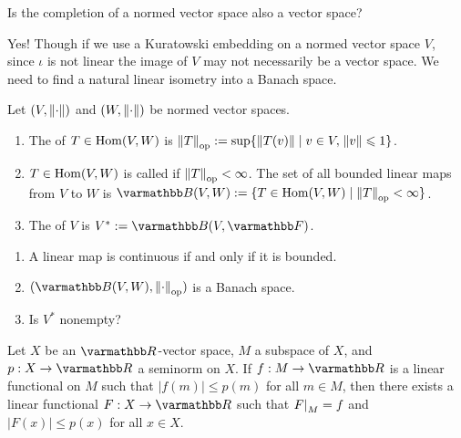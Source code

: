 \documentclass[10pt,oneside,openany]{memoir}
\begin{document}
\begin{question}
Is the completion of a normed vector space also a vector space?
\end{question}
\begin{answer}
Yes! Though if we use a Kuratowski embedding on a normed vector space $V$, since $\iota$ is not linear the image of $V$ may not necessarily be a vector space. We need to find a natural linear isometry into a Banach space.
\end{answer}

\begin{definition}
    Let $(V,\lnorm \cdot \rnorm)$ and $(W,\lnorm \cdot\rnorm)$ be normed vector spaces.
    \begin{enumerate}[label = (\arabic*),itemsep=1pt,topsep=3pt]
        \item The  of $T \in \Hom(V,W)$ is $\lnorm T \rnorm_{\op} := \sup\{\lnorm T(v) \rnorm \mid v \in V, \h1\lnorm v \rnorm \leq 1\}$.
        \item $T \in \Hom(V,W)$ is called  if $\lnorm T \rnorm_{\op} < \infty$. The set of all bounded linear maps from $V$ to $W$ is $\bfB(V,W) := \{T \in \Hom(V,W) \mid \lnorm T \rnorm_{\op} < \infty\}$.
        \item The  of $V$ is $V^\ast:= \bfB(V,\bfF)$.
    \end{enumerate}
\end{definition}

\begin{remarks}
\phantom{a}
\begin{enumerate}[label = (\arabic*),itemsep=1pt,topsep=3pt]
    \item A linear map is continuous if and only if it is bounded. 
    \item $(\bfB(V,W), \lnorm \cdot\rnorm_{\op})$ is a Banach space.
    \item Is $V^\ast$ nonempty?
\end{enumerate}
\end{remarks}

\begin{theorem}
    Let $X$ be an $\bfR$-vector space, $M$ a subspace of $X$, and $p:X \rightarrow \bfR$ a seminorm on $X$. If $f:M \rightarrow \bfR$ is a linear functional on $M$ such that $|f(m)| \leq p(m)$ for all $m \in M$, then there exists a linear functional $F:X \rightarrow \bfR$ such that $\restr{F}{M} = f$ and $|F(x)| \leq p(x)$ for all $x \in X$. 
\end{theorem}
\end{document}
